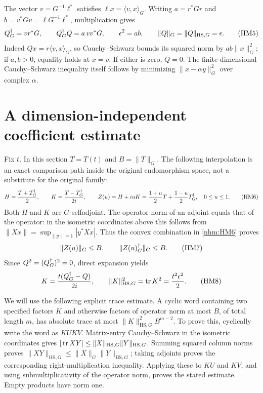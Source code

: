 \documentclass[11pt]{article}
\begin{document}
The vector \(v=G^{-1}\ell^*\) satisfies \(\ell x=\langle v,x\rangle_G\).
Writing \(a=r^*Gr\) and \(b=v^*Gv=\ell G^{-1}\ell^*\), multiplication gives
\begin{equation}
 Q^\dagger_G=vr^*G,\qquad Q^\dagger_G Q=a\,vv^*G,\qquad
 \epsilon^2=ab,\qquad
 \|Q\|_G=\|Q\|_{\mathrm{HS},G}=\epsilon.
 \tag{HM5}\label{nhm:HM5}
\end{equation}
Indeed \(Qx=r\langle v,x\rangle_G\), so Cauchy--Schwarz bounds its squared
norm by \(ab\|x\|_G^2\); if \(a,b>0\), equality holds at \(x=v\).
If either is zero, \(Q=0\). The finite-dimensional Cauchy--Schwarz inequality
itself follows by minimizing \(\|x-\alpha y\|_G^2\) over complex \(\alpha\).

\section{A dimension-independent coefficient estimate}

Fix \(t\). In this section \(T=T(t)\) and \(B=\|T\|_G\).
The following interpolation is an exact comparison path inside the original
endomorphism space, not a substitute for the original family:
\begin{equation}
 H=\frac{T+T^\dagger_G}{2},\qquad K=\frac{T-T^\dagger_G}{2i},\qquad
 Z(u)=H+iuK=\frac{1+u}{2}T+\frac{1-u}{2}T^\dagger_G,
 \quad 0\le u\le1.
 \tag{HM6}\label{nhm:HM6}
\end{equation}
Both \(H\) and \(K\) are \(G\)-selfadjoint. The operator norm of an adjoint
equals that of the operator: in the isometric coordinates above this follows
from \(\|Xx\|=\sup_{\|y\|=1}|y^*Xx|\).
Thus the convex combination in \eqref{nhm:HM6} proves
\begin{equation}
 \|Z(u)\|_G\le B,\qquad \|Z(u)^\dagger_G\|_G\le B.
 \tag{HM7}\label{nhm:HM7}
\end{equation}
Since \(Q^2=(Q^\dagger_G)^2=0\), direct expansion yields
\begin{equation}
 K=\frac{t(Q^\dagger_G-Q)}{2i},\qquad
 \|K\|_{\mathrm{HS},G}^2=\operatorname{tr} K^2=\frac{t^2\epsilon^2}{2}.
 \tag{HM8}\label{nhm:HM8}
\end{equation}

We will use the following explicit trace estimate. A cyclic word containing
two specified factors \(K\) and otherwise factors of operator norm at most
\(B\), of total length \(m\), has absolute trace at most
\(\|K\|_{\mathrm{HS},G}^2 B^{m-2}\).
To prove this, cyclically write the word as \(K U K V\). Matrix-entry
Cauchy--Schwarz in the isometric coordinates gives
\(|\operatorname{tr} XY|\le\|X\|_{\mathrm{HS},G}\|Y\|_{\mathrm{HS},G}\).
Summing squared column norms proves
\(\|XY\|_{\mathrm{HS},G}\le\|X\|_G\|Y\|_{\mathrm{HS},G}\);
taking adjoints proves the corresponding right-multiplication inequality.
Applying these to \(KU\) and \(KV\), and using submultiplicativity of the
operator norm, proves the stated estimate. Empty products have norm one.
\end{document}
